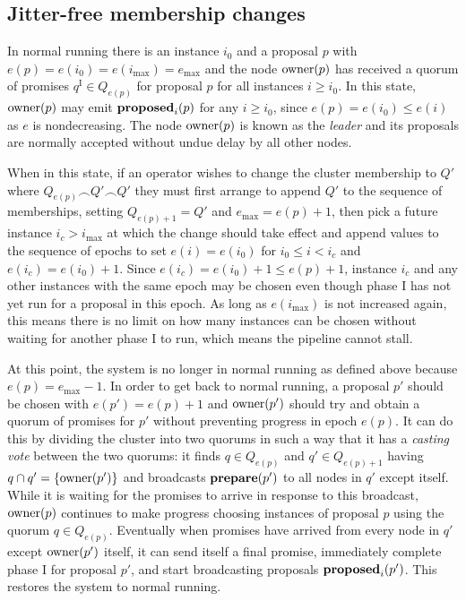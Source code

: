 \documentclass[journal]{IEEEtran}
\begin{document}
\subsection{Jitter-free membership changes}

In normal running there is an instance $i_0$ and a proposal $p$ with ${e(p) =
e(i_0) = e(i_\mathrm{max}) = e_\mathrm{max}}$ and the node $\mathrm{owner}(p)$ has
received a quorum of promises $q^\textrm{I} \in Q_{e(p)}$ for proposal $p$ for
all instances $i \ge i_0$. In this state, $\mathrm{owner}(p)$ may emit $\mathbf{proposed}_{i}(p)$
for any $i \ge i_0$, since $e(p) = e(i_0) \le e(i)$ as $e$ is nondecreasing.
The node $\mathrm{owner}(p)$ is known as the \textit{leader} and its proposals are
normally accepted without undue delay by all other nodes.

When in this state, if an operator wishes to change the cluster membership to
$Q'$ where $Q_{e(p)} \frown Q' \frown Q'$ they must first arrange to
append $Q'$ to the sequence of memberships, setting $Q_{e(p)+1} = Q'$ and
$e_\mathrm{max} = e(p) + 1$, then pick a future instance $i_c > i_\mathrm{max}$
at which the change should take effect and append values to the sequence of
epochs to set $e(i) = e(i_0)$ for $i_0 \le i < i_c$ and $e(i_c) = e(i_0) + 1$.
Since $e(i_c) = e(i_0) + 1 \le e(p) + 1$, instance $i_c$ and any other
instances with the same epoch may be chosen even though phase I has not yet run
for a proposal in this epoch. As long as $e(i_\mathrm{max})$ is not increased
again, this means there is no limit on how many instances can be chosen without
waiting for another phase I to run, which means the pipeline cannot stall.

At this point, the system is no longer in normal running as defined above
because $e(p) = e_\mathrm{max} - 1$. In order to get back to normal running, a
proposal $p'$ should be chosen with $e(p') = e(p) + 1$ and $\mathrm{owner}(p')$ should
try and obtain a quorum of promises for $p'$ without preventing progress in
epoch $e(p)$. It can do this by dividing the cluster into two quorums in such a
way that it has a \textit{casting vote} between the two quorums: it finds $q
\in Q_{e(p)}$ and $q' \in Q_{e(p)+1}$ having $q \cap q' = \{\mathrm{owner}(p')\}$ and
broadcasts $\mathbf{prepare}(p')$ to all nodes in $q'$ except itself. While it is waiting
for the promises to arrive in response to this broadcast, $\mathrm{owner}(p)$ continues
to make progress choosing instances of proposal $p$ using the quorum $q \in
Q_{e(p)}$.  Eventually when promises have arrived from every node in $q'$
except $\mathrm{owner}(p')$ itself, it can send itself a final promise, immediately
complete phase I for proposal $p'$, and start broadcasting proposals
$\mathbf{proposed}_{i}(p')$.  This restores the system to normal running.
\end{document}

